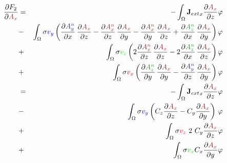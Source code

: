 \documentclass[smallextended]{svjour3}       %
\begin{document}
			\begin{eqnarray}
			\frac{\partial F_2}{\partial \textcolor{darkred}{A_x}} & = &
			-\int_{\Omega} {\mathbf{J}_{ext}}_x \frac{\partial \textcolor{darkred}{A_x}}{\partial z} \varphi				
			\nonumber \\
			& - &\int_{\Omega} \sigma \textcolor{blu}{v_y} \left(
			\frac{\partial \textcolor{darkblu}{A_y^n}}{\partial x}\,\frac{\partial \textcolor{darkred}{A_x}}{\partial z}
			- \frac{\partial \textcolor{darkred}{A_x^n}}{\partial z}\,\frac{\partial \textcolor{darkred}{A_x}}{\partial y}
			- \frac{\partial \textcolor{darkred}{A_x^n}}{\partial y}\,\frac{\partial \textcolor{darkred}{A_x}}{\partial z}
			+ \frac{\partial \textcolor{darkgre}{A_z^n}}{\partial x}\,\frac{\partial \textcolor{darkred}{A_x}}{\partial y}
				\right) \varphi \nonumber \\			
			& + &\int_{\Omega} \sigma \textcolor{gre}{v_z} \left(
			2 \frac{\partial \textcolor{darkred}{A_x^n}}{\partial z}\,\frac{\partial \textcolor{darkred}{A_x}}{\partial z}
			- 2 \frac{\partial \textcolor{darkgre}{A_z^n}}{\partial x}\,\frac{\partial \textcolor{darkred}{A_x}}{\partial z}\right) \varphi \nonumber \\			
			& + &\int_{\Omega} \sigma \textcolor{red}{v_x} \left(
			\frac{\partial \textcolor{darkgre}{A_z^n}}{\partial y}\,\frac{\partial \textcolor{darkred}{A_x}}{\partial y}
			- \frac{\partial \textcolor{darkblu}{A_y^n}}{\partial z}\,\frac{\partial \textcolor{darkred}{A_x}}{\partial y}
				\right) \varphi \nonumber \\		
			 & = &
			-\int_{\Omega} {\mathbf{J}_{ext}}_x \frac{\partial \textcolor{darkred}{A_x}}{\partial z} \varphi				
			\nonumber \\
			& - &\int_{\Omega} \sigma  \textcolor{blu}{v_y} \left( C_z \frac{\partial \textcolor{darkred}{A_x}}{\partial z} - C_y \frac{\partial \textcolor{darkred}{A_x}}{\partial y}\right)\,\varphi \nonumber \\			
			& + &\int_{\Omega} \sigma  \textcolor{red}{v_z} \ 2\ C_y \frac{\partial \textcolor{darkred}{A_x}}{\partial z} \varphi \nonumber \\			
			& + & \int_{\Omega} \sigma \textcolor{gre}{v_x} C_x \frac{\partial \textcolor{darkred}{A_x}}{\partial y}  \varphi
						\end{eqnarray}
						
\end{document}
